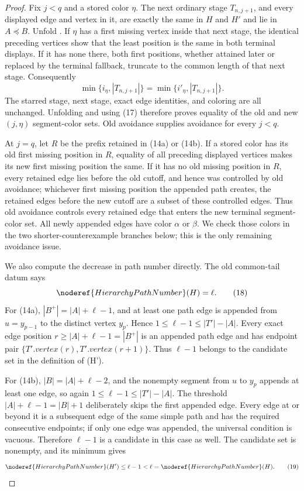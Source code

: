 \begin{proof}
Fix \(j<q\) and a stored color \(\eta\).  The next ordinary stage
\(T_{n,j+1}\), and every displayed edge and vertex in it, are exactly the
same in \(H\) and \(H'\) and lie in \(A\preccurlyeq B\).  Unfold
.  If \(\eta\) has a first missing
vertex inside that next stage, the identical preceding vertices show that
the least position is the same in both terminal displays.  If it has none
there, both first positions, whether attained later or replaced by the
terminal fallback, truncate to the common length of that next stage.
Consequently
\[
 \min\{i_\eta,|T_{n,j+1}|\}
   =\min\{i'_\eta,|T_{n,j+1}|\}.                              \tag{17}
\]
The starred stage, next stage, exact edge identities, and coloring are all
unchanged.  Unfolding  and using (17)
therefore proves equality of the old and new \((j,\eta)\) segment-color
sets.  Old avoidance supplies avoidance for every \(j<q\).

At \(j=q\), let \(R\) be the prefix retained in (14a) or (14b).  If a
stored color has its old first missing position in \(R\), equality of all
preceding displayed vertices makes its new first missing position the same.
If it has no old missing position in \(R\), every retained edge lies before
the old cutoff, and hence was controlled by old avoidance; whichever first
missing position the appended path creates, the retained edges before the
new cutoff are a subset of these controlled edges.  Thus old avoidance
controls every retained edge that enters the new terminal segment-color
set.  All newly appended edges have color \(\alpha\) or \(\beta\).  We
check those colors in the two shorter-counterexample branches below; this
is the only remaining avoidance issue.

We also compute the decrease in path number directly.  The old common-tail
datum says
\[
          \noderef{HierarchyPathNumber}(H)=\ell.              \tag{18}
\]
For (14a), \(|B^+|=|A|+\ell-1\), and at least one path edge is appended
from \(u=y_{p-1}\) to the distinct vertex \(y_p\).  Hence
\(1\leq\ell-1\leq |T'|-|A|\).  Every exact edge position
\(r\geq|A|+\ell-1=|B^+|\) is an appended path edge and has endpoint pair
\(\{T'.\mathit{vertex}(r),T'.\mathit{vertex}(r+1)\}\).
Thus \(\ell-1\) belongs to the candidate set in the definition of
(H')\).

For (14b), \(|B|=|A|+\ell-2\), and the nonempty segment from \(u\) to
\(y_p\) appends at least one edge, so again
\(1\leq\ell-1\leq |T'|-|A|\).  The threshold
\(|A|+\ell-1=|B|+1\) deliberately skips the first appended edge.  Every
edge at or beyond it is a subsequent edge of the same simple path and has
the required consecutive endpoints; if only one edge was appended, the
universal condition is vacuous.  Therefore \(\ell-1\) is a candidate in
this case as well.  The candidate set is nonempty, and its minimum gives
\[
 \noderef{HierarchyPathNumber}(H')\leq\ell-1<\ell
    =\noderef{HierarchyPathNumber}(H).                        \tag{19}
\]


\end{proof}
